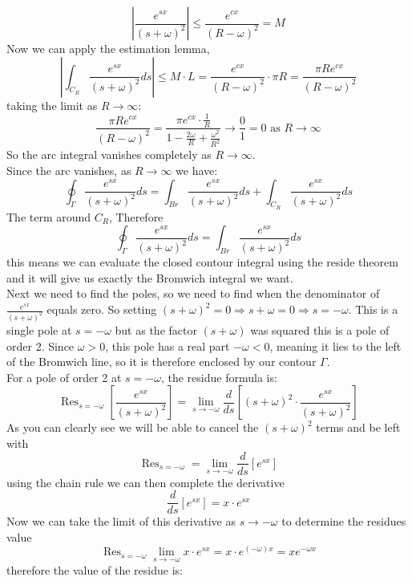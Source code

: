 \begin{equation}
    \left|\frac{e^{sx}}{(s+\omega)^{2}}\right|\leq\frac{e^{cx}}{(R-\omega)^{2}}=M
\end{equation}
Now we can apply the estimation lemma, 
\begin{equation}
    \left|\int_{C_{R}}\frac{e^{sx}}{(s+\omega)^{2}}ds\right|\leq M\cdot L=\frac{e^{cx}}{(R-\omega)^{2}}\cdot\pi R=\frac{\pi Re^{cx}}{(R-\omega)^{2}}
\end{equation}
taking the limit as $R\rightarrow\infty$: 
\begin{equation}
    \frac{\pi Re^{cx}}{(R-\omega)^{2}}=\frac{\pi e^{cx}\cdot\frac{1}{R}}{1-\frac{2\omega}{R}+\frac{\omega^{2}}{R^{2}}}\rightarrow\frac{0}{1}=0 \text{ as } R\rightarrow\infty
\end{equation}
So the arc integral vanishes completely as $R\rightarrow\infty$. 
\\
Since the arc vanishes, as $R\rightarrow\infty$ we have: 
\begin{equation}
    \oint_{\Gamma}\frac{e^{sx}}{(s+\omega)^{2}}ds=\int_{Br}\frac{e^{sx}}{(s+\omega)^{2}}ds+\int_{C_{R}}\frac{e^{sx}}{(s+\omega)^{2}}ds
\end{equation}
The term around $C_{R}$, Therefore 
\begin{equation}
    \oint_{\Gamma}\frac{e^{sx}}{(s+\omega)^{2}}ds=\int_{Br}\frac{e^{sx}}{(s+\omega)^{2}}ds
\end{equation}
this means we can evaluate the closed contour integral using the reside theorem and it will give us exactly the Bromwich integral we want. 
\\
Next we need to find the poles, so we need to find when the denominator of $\frac{e^{sx}}{(s+\omega)^{2}}$ equals zero. So setting $(s+\omega)^{2}=0\Rightarrow s+\omega=0 \Rightarrow s=-\omega$. This is a single pole at $s=-\omega$ but as the factor $(s+\omega)$ was squared this is a pole of order 2. Since $\omega>0$, this pole has a real part $-\omega<0$, meaning it lies to the left of the Bromwich line, so it is therefore enclosed by our contour $\Gamma$.
\\
For a pole of order 2 at $s=-\omega$, the residue formula is: 
\begin{equation}
    \operatorname{Res}_{s=-\omega}\left[\frac{e^{sx}}{(s+\omega)^{2}}\right]=\lim_{s\rightarrow -\omega}\frac{d}{ds}\left[(s+\omega)^{2}\cdot\frac{e^{sx}}{(s+\omega)^{2}}\right]
\end{equation}
As you can clearly see we will be able to cancel the $(s+\omega)^{2}$ terms and be left with $$\operatorname{Res}_{s=-\omega}=\lim_{s\rightarrow-\omega}\frac{d}{ds}[e^{sx}]$$ using the chain rule we can then complete the derivative $$\frac{d}{ds}[e^{sx}]=x\cdot e^{sx}$$ Now we can take the limit of this derivative as $s\rightarrow -\omega$ to determine the residues value $$\operatorname{Res}_{s=-\omega}\lim_{s\rightarrow-\omega}x\cdot e^{sx}=x\cdot e^{(-\omega)x}=xe^{-\omega x}$$ therefore the value of the residue is: 
